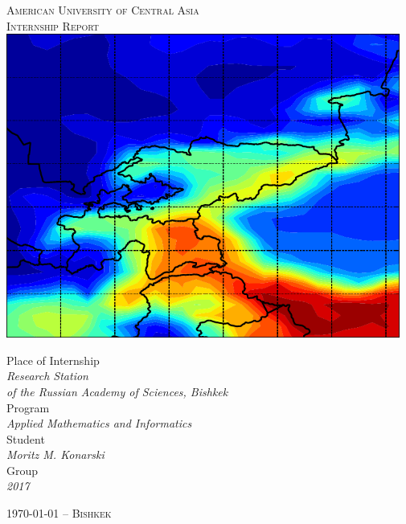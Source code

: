 \documentclass[a4paper, 12pt, reqno]{article}
\newcommand{\titl}{Internship Report}
\newcommand{\auth}{Moritz M. Konarski}
\begin{document}
\thispagestyle{empty}
\begin{center}
    \Large
    \vspace{10pt}
    \textsc{American University of Central Asia}\\[10pt]
    \textsc{\titl{}}\\ [1.5cm]

    \includegraphics[height=10cm]{../graphics/title_pic}

    \vspace{1.5cm}

    \normalsize
    Place of Internship\\
    \textit{Research Station \\
    of the Russian Academy of Sciences, Bishkek}\\[10pt]

    Program\\
    \textit{Applied Mathematics and Informatics}\\[10pt]

    Student\\
    \textit{\auth{}}\\[10pt]

    Group\\
    \textit{2017}\\

    \vfill

    \large
    \textsc{\today{} -- Bishkek}
    \normalsize
\end{center}

\restoregeometry
\newpage

\afterpage{\cfoot{\thepage}}
\tableofcontents
\end{document}
